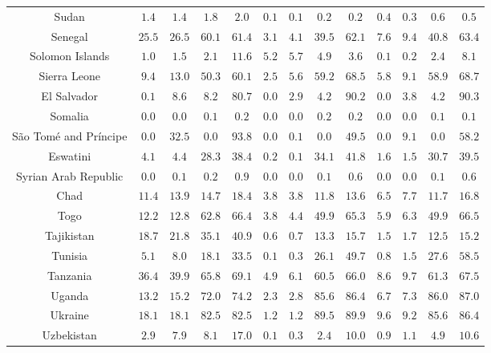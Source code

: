 \begin{longtable}{ccccccccccccc}
Sudan & $1.4$ & $1.4$ & $1.8$ & $2.0$ & $0.1$ & $0.1$ & $0.2$ & $0.2$ & $0.4$ & $0.3$ & $0.6$ & $0.5$ \\ 
Senegal & $25.5$ & $26.5$ & $60.1$ & $61.4$ & $3.1$ & $4.1$ & $39.5$ & $62.1$ & $7.6$ & $9.4$ & $40.8$ & $63.4$ \\ 
Solomon Islands & $1.0$ & $1.5$ & $2.1$ & $11.6$ & $5.2$ & $5.7$ & $4.9$ & $3.6$ & $0.1$ & $0.2$ & $2.4$ & $8.1$ \\ 
Sierra Leone & $9.4$ & $13.0$ & $50.3$ & $60.1$ & $2.5$ & $5.6$ & $59.2$ & $68.5$ & $5.8$ & $9.1$ & $58.9$ & $68.7$ \\ 
El Salvador & $0.1$ & $8.6$ & $8.2$ & $80.7$ & $0.0$ & $2.9$ & $4.2$ & $90.2$ & $0.0$ & $3.8$ & $4.2$ & $90.3$ \\ 
Somalia & $0.0$ & $0.0$ & $0.1$ & $0.2$ & $0.0$ & $0.0$ & $0.2$ & $0.2$ & $0.0$ & $0.0$ & $0.1$ & $0.1$ \\ 
São Tomé and Príncipe & $0.0$ & $32.5$ & $0.0$ & $93.8$ & $0.0$ & $0.1$ & $0.0$ & $49.5$ & $0.0$ & $9.1$ & $0.0$ & $58.2$ \\ 
Eswatini & $4.1$ & $4.4$ & $28.3$ & $38.4$ & $0.2$ & $0.1$ & $34.1$ & $41.8$ & $1.6$ & $1.5$ & $30.7$ & $39.5$ \\ 
Syrian Arab Republic & $0.0$ & $0.1$ & $0.2$ & $0.9$ & $0.0$ & $0.0$ & $0.1$ & $0.6$ & $0.0$ & $0.0$ & $0.1$ & $0.6$ \\ 
Chad & $11.4$ & $13.9$ & $14.7$ & $18.4$ & $3.8$ & $3.8$ & $11.8$ & $13.6$ & $6.5$ & $7.7$ & $11.7$ & $16.8$ \\ 
Togo & $12.2$ & $12.8$ & $62.8$ & $66.4$ & $3.8$ & $4.4$ & $49.9$ & $65.3$ & $5.9$ & $6.3$ & $49.9$ & $66.5$ \\ 
Tajikistan & $18.7$ & $21.8$ & $35.1$ & $40.9$ & $0.6$ & $0.7$ & $13.3$ & $15.7$ & $1.5$ & $1.7$ & $12.5$ & $15.2$ \\ 
Tunisia & $5.1$ & $8.0$ & $18.1$ & $33.5$ & $0.1$ & $0.3$ & $26.1$ & $49.7$ & $0.8$ & $1.5$ & $27.6$ & $58.5$ \\ 
Tanzania & $36.4$ & $39.9$ & $65.8$ & $69.1$ & $4.9$ & $6.1$ & $60.5$ & $66.0$ & $8.6$ & $9.7$ & $61.3$ & $67.5$ \\ 
Uganda & $13.2$ & $15.2$ & $72.0$ & $74.2$ & $2.3$ & $2.8$ & $85.6$ & $86.4$ & $6.7$ & $7.3$ & $86.0$ & $87.0$ \\ 
Ukraine & $18.1$ & $18.1$ & $82.5$ & $82.5$ & $1.2$ & $1.2$ & $89.5$ & $89.9$ & $9.6$ & $9.2$ & $85.6$ & $86.4$ \\ 
Uzbekistan & $2.9$ & $7.9$ & $8.1$ & $17.0$ & $0.1$ & $0.3$ & $2.4$ & $10.0$ & $0.9$ & $1.1$ & $4.9$ & $10.6$ \\ 

\end{longtable}
